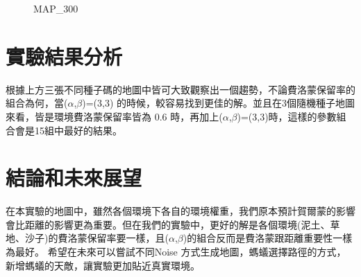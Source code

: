 \documentclass[sigconf]{acmart}
\begin{document}
\begin{figure}[H]
  \vspace{-\baselineskip}  
  \centering  
    \caption{MAP\_300}
    \label{fig:3}
  \vspace{-\baselineskip}
\end{figure}

	

\section{實驗結果分析}

根據上方三張不同種子碼的地圖中皆可大致觀察出一個趨勢，不論費洛蒙保留率的組合為何，當($\alpha$,$\beta$)=(3,3) 的時候，較容易找到更佳的解。並且在3個隨機種子地圖來看，皆是環境費洛蒙保留率皆為 0.6 時，再加上($\alpha$,$\beta$)=(3,3)時，這樣的參數組合會是15組中最好的結果。




\section{結論和未來展望}
\label{sec:simulation}

在本實驗的地圖中，雖然各個環境下各自的環境權重，我們原本預計賀爾蒙的影響會比距離的影響更為重要。但在我們的實驗中，更好的解是各個環境(泥土、草地、沙子)的費洛蒙保留率要一樣，且($\alpha$,$\beta$)的組合反而是費洛蒙跟距離重要性一樣為最好。
 希望在未來可以嘗試不同Noise 方式生成地圖，螞蟻選擇路徑的方式，新增螞蟻的天敵，讓實驗更加貼近真實環境。



 


\nocite{ACO}
\nocite{ANT}
\nocite{EMOJI}
\end{document}
